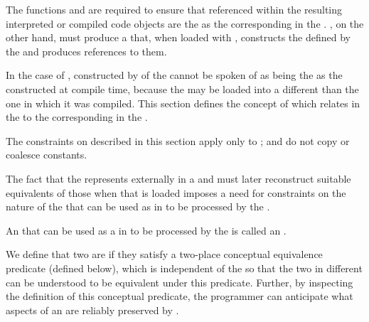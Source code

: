 


The functions  and  are
required to ensure that  referenced within the resulting
interpreted or compiled code objects are the  as the
corresponding  in the .
, on the other hand, 
must produce a  that, when loaded with
, constructs the  defined by the
 and produces references to them.
 
In the case of , 
constructed by  of the  cannot be spoken
of as being the  as the  constructed at
compile time, because the  may be loaded into a different
 than the one in which it was compiled.  This section
defines the concept of  which relates
 in the  to the
corresponding  in the .
 
The constraints on  described in this section
apply only to ;
 and  do not copy or coalesce constants.


The fact that the  represents   
externally in a  and must later reconstruct suitable 
equivalents of those  when that  is loaded
imposes a need for constraints on the nature of the  that can be 
used as   in  to be processed 
by the .

An  that can be used as a   
in  to be processed by the  is called an
.

We define that two  are  if they satisfy
a two-place conceptual equivalence predicate (defined below), which is
independent of the  so that the two  in
different  can be understood to be equivalent under
this predicate.  Further, by inspecting the definition of this conceptual
predicate, the programmer can anticipate what aspects of an 
are reliably preserved by .


